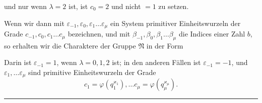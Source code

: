 und nur wenn $\lambda = 2$ ist, ist $c_0 = 2$ und nicht $= 1$ zu setzen.

Wenn wir dann mit $\varepsilon_{-1}, \varepsilon_0, \varepsilon_1 \ldots \varepsilon_\mu$ ein System primitiver
Einheitswurzeln der Grade $c_{-1}, c_0, c_1 \ldots c_\mu$ bezeichnen, und mit
$\beta_{-1}, \beta_0, \beta_1 \ldots \beta_\mu$ die Indices einer Zahl $b$, so erhalten wir die
Charaktere der Gruppe $\mathfrak{N}$ in der Form


Darin ist $\varepsilon_{-1} = 1$, wenn $\lambda = 0, 1, 2$ ist; in den anderen
F\"allen ist $\varepsilon_{-1} = -1$, und $\varepsilon_1, \ldots \varepsilon_\mu$ sind primitive Einheitswurzeln
 der Grade
\[
c_1 = \varphi(q_1^{\varkappa_1}), \ldots c_\mu = \varphi(q_\mu^{\varkappa_\mu}).
\]

\begin{center}
\rule{3cm}{0.4pt}
\end{center}
